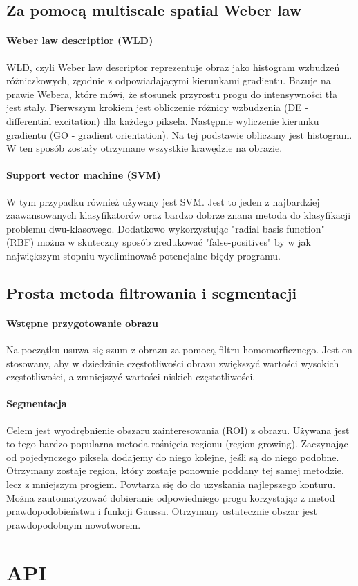 \documentclass{sprawozdanie-agh}
\begin{document}
\subsection{Za pomocą multiscale spatial Weber law}
\paragraph{Weber law descriptior (WLD)\\}
WLD, czyli Weber law descriptor reprezentuje obraz jako histogram wzbudzeń różniczkowych, zgodnie z odpowiadającymi kierunkami gradientu. Bazuje na prawie Webera, które mówi, że stosunek przyrostu progu do intensywności tła jest stały. Pierwszym krokiem jest obliczenie różnicy wzbudzenia (DE - differential excitation) dla każdego piksela. Następnie wyliczenie kierunku gradientu (GO - gradient orientation). Na tej podstawie obliczany jest histogram. W ten sposób zostały otrzymane wszystkie krawędzie na obrazie.

\paragraph{Support vector machine (SVM)\\}
W tym przypadku również używany jest SVM. Jest to jeden z najbardziej zaawansowanych klasyfikatorów oraz bardzo dobrze znana metoda do klasyfikacji problemu dwu-klasowego. Dodatkowo wykorzystując "radial basis function" (RBF) można w skuteczny sposób zredukować "false-positives" by w jak największym stopniu wyeliminować potencjalne błędy programu.

\subsection{Prosta metoda filtrowania i segmentacji}
\paragraph{Wstępne przygotowanie obrazu\\}
Na początku usuwa się szum z obrazu za pomocą filtru homomorficznego. Jest on stosowany, aby w dziedzinie częstotliwości obrazu zwiększyć wartości wysokich częstotliwości, a zmniejszyć wartości niskich częstotliwości.

\paragraph{Segmentacja\\}
Celem jest wyodrębnienie obszaru zainteresowania (ROI) z obrazu. Używana jest to tego bardzo popularna metoda rośnięcia regionu (region growing). Zaczynając od pojedynczego piksela dodajemy do niego kolejne, jeśli są do niego podobne. Otrzymany zostaje region, który zostaje ponownie poddany tej samej metodzie, lecz z mniejszym progiem. Powtarza się do do uzyskania najlepszego konturu. Można zautomatyzować dobieranie odpowiedniego progu korzystając z metod prawdopodobieństwa i funkcji Gaussa. Otrzymany ostatecznie obszar jest prawdopodobnym nowotworem.

\section{API}
\end{document}
